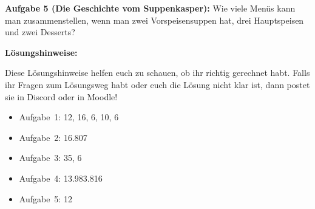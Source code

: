 \documentclass{../cssheet}
\begin{document}
\textbf{Aufgabe 5 (Die Geschichte vom Suppenkasper):} Wie viele Menüs kann man zusammenstellen, wenn man zwei Vorspeisensuppen hat, drei Hauptspeisen und zwei Desserts?


\textbf{Lösungshinweise:} 

Diese Lösungshinweise helfen euch zu schauen, ob ihr richtig gerechnet habt. Falls ihr Fragen zum Lösungsweg habt oder euch die Lösung nicht klar ist, dann postet sie in Discord oder in Moodle!

\begin{itemize}
\item Aufgabe~1: 12, 16, 6, 10, 6
\item Aufgabe~2: 16.807
\item Aufgabe~3: 35, 6
\item Aufgabe~4: 13.983.816
\item Aufgabe~5: 12
\end{itemize}

\newpage
\printlicense

\printsocials
\end{document}
